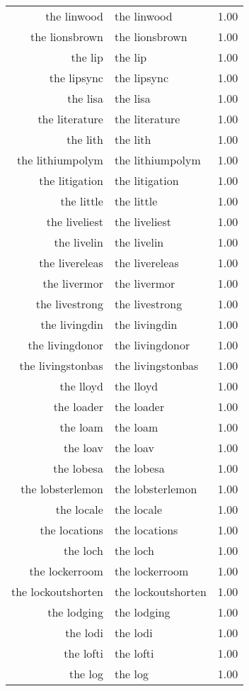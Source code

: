 \begin{table}[ht]
\begin{tabular}{rlr}
  the linwood & the linwood & 1.00 \\ 
  the lionsbrown & the lionsbrown & 1.00 \\ 
  the lip & the lip & 1.00 \\ 
  the lipsync & the lipsync & 1.00 \\ 
  the lisa & the lisa & 1.00 \\ 
  the literature & the literature & 1.00 \\ 
  the lith & the lith & 1.00 \\ 
  the lithiumpolym & the lithiumpolym & 1.00 \\ 
  the litigation & the litigation & 1.00 \\ 
  the little & the little & 1.00 \\ 
  the liveliest & the liveliest & 1.00 \\ 
  the livelin & the livelin & 1.00 \\ 
  the livereleas & the livereleas & 1.00 \\ 
  the livermor & the livermor & 1.00 \\ 
  the livestrong & the livestrong & 1.00 \\ 
  the livingdin & the livingdin & 1.00 \\ 
  the livingdonor & the livingdonor & 1.00 \\ 
  the livingstonbas & the livingstonbas & 1.00 \\ 
  the lloyd & the lloyd & 1.00 \\ 
  the loader & the loader & 1.00 \\ 
  the loam & the loam & 1.00 \\ 
  the loav & the loav & 1.00 \\ 
  the lobesa & the lobesa & 1.00 \\ 
  the lobsterlemon & the lobsterlemon & 1.00 \\ 
  the locale & the locale & 1.00 \\ 
  the locations & the locations & 1.00 \\ 
  the loch & the loch & 1.00 \\ 
  the lockerroom & the lockerroom & 1.00 \\ 
  the lockoutshorten & the lockoutshorten & 1.00 \\ 
  the lodging & the lodging & 1.00 \\ 
  the lodi & the lodi & 1.00 \\ 
  the lofti & the lofti & 1.00 \\ 
  the log & the log & 1.00 \\ 

\end{tabular}
\end{table}
